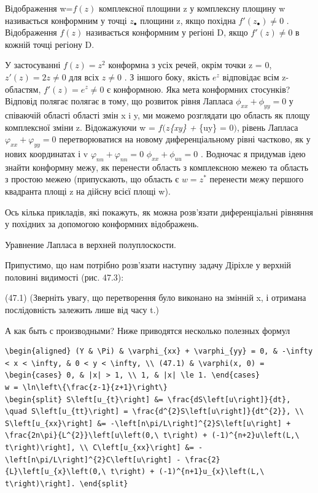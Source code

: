 \documentclass[
  ukrainian,
]{article}
\begin{document}
Відображення w=\(f(z)\) комплексної площини z у комплексну площину w
називається конформним у точці \(z_{\bullet}\) площини z, якщо похідна
\(f'(z_{\bullet}) \neq 0\) . Відображення \(f(z)\) називається
конформним у регіоні D, якщо \(f'(z) \neq 0\) в кожній точці регіону D.

У застосуванні \(f(z) = z^2\) конформна з усіх речей, окрім точки z = 0,
\(z'(z) = 2z \neq 0\) для всіх \(z \neq 0\) . З іншого боку, якість
\(e^z\) відповідає всім z-областям, \(f'(z) = e^z \neq 0\) є конформною.
Яка мета конформних стосунків? Відповід полягає полягає в тому, що
розвиток рівня Лапласа \(\phi_{xx} + \phi_{yy} = 0\) у співаючій області
області змін x i y, ми можемо розглядати цю область як площу комплексної
зміни z. Відожажуючи w = \(f(z\)\phi\emph{\{xy\} + \phi}\{uy\} = 0\()\),
рівень Лапласа \(\varphi_{xx} + \varphi_{yy} = 0\) перетворюватися на
новому диференціальному рівні частково, як у нових координатах і v
\(\varphi_{nn} + \varphi_{nn} = 0\) \(\phi_{xx} + \phi_{uu} = 0\) .
Водночас я придумав ідею знайти конформну межу, як перенести область з
комплексною межею та область з простою межею (припускають, що область є
\(w=z^*\) перенести межу першого квадранта площі z на дійсну всієї площі
w).

Ось кілька прикладів, які покажуть, як можна розв'язати диференціальні
рівняння у похідних за допомогою конформних відображень.

Уравнение Лапласа в верхней полуплоскости.

Припустимо, що нам потрібно розв'язати наступну задачу Діріхле у верхній
половині видимості (рис. 47.3):

(47.1) (Зверніть увагу, що перетворення було виконано на змінній x, і
отримана послідовність залежить лише від часу t.)

А как быть с производными? Ниже приводятся несколько полезных формул

\begin{verbatim}
\begin{aligned} (Y & \Pi) & \varphi_{xx} + \varphi_{yy} = 0, & -\infty < x < \infty, & 0 < y < \infty, \\ (47.1) & \varphi(x, 0) = \begin{cases} 0, & |x| > 1, \\ 1, & |x| \le 1. \end{cases}
w = \ln\left\{\frac{z-1}{z+1}\right\}
\begin{split} S\left[u_{t}\right] &= \frac{dS\left[u\right]}{dt}, \quad S\left[u_{tt}\right] = \frac{d^{2}S\left[u\right]}{dt^{2}}, \\ S\left[u_{xx}\right] &= -\left[n\pi/L\right]^{2}S\left[u\right] + \frac{2n\pi}{L^{2}}\left[u\left(0,\ t\right) + (-1)^{n+2}u\left(L,\ t\right)\right], \\ C\left[u_{xx}\right] &= -\left[n\pi/L\right]^{2}C\left[u\right] - \frac{2}{L}\left[u_{x}\left(0,\ t\right) + (-1)^{n+1}u_{x}\left(L,\ t\right)\right]. \end{split}
\end{verbatim}
\end{document}
